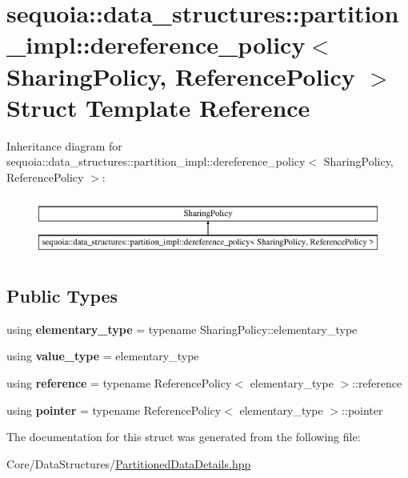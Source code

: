 \hypertarget{structsequoia_1_1data__structures_1_1partition__impl_1_1dereference__policy}{}\section{sequoia\+::data\+\_\+structures\+::partition\+\_\+impl\+::dereference\+\_\+policy$<$ Sharing\+Policy, Reference\+Policy $>$ Struct Template Reference}
\label{structsequoia_1_1data__structures_1_1partition__impl_1_1dereference__policy}
Inheritance diagram for sequoia\+::data\+\_\+structures\+::partition\+\_\+impl\+::dereference\+\_\+policy$<$ Sharing\+Policy, Reference\+Policy $>$\+:\begin{figure}[H]
\begin{center}
\leavevmode
\includegraphics[height=2.000000cm]{structsequoia_1_1data__structures_1_1partition__impl_1_1dereference__policy}
\end{center}
\end{figure}
\subsection*{Public Types}
\begin{DoxyCompactItemize}
\item 
\mbox{\label{structsequoia_1_1data__structures_1_1partition__impl_1_1dereference__policy_a78e942760cb717bfc3a812b8de2b7810}} 
using {\bfseries elementary\+\_\+type} = typename Sharing\+Policy\+::elementary\+\_\+type
\item 
\mbox{\label{structsequoia_1_1data__structures_1_1partition__impl_1_1dereference__policy_a9dea1ba6996bd3ed1021e483abe0fa48}} 
using {\bfseries value\+\_\+type} = elementary\+\_\+type
\item 
\mbox{\label{structsequoia_1_1data__structures_1_1partition__impl_1_1dereference__policy_afed10ebec2c1172836f4f5a988ed6a52}} 
using {\bfseries reference} = typename Reference\+Policy$<$ elementary\+\_\+type $>$\+::reference
\item 
\mbox{\label{structsequoia_1_1data__structures_1_1partition__impl_1_1dereference__policy_a803285e673cdf7c68a89b74e8ae7c164}} 
using {\bfseries pointer} = typename Reference\+Policy$<$ elementary\+\_\+type $>$\+::pointer
\end{DoxyCompactItemize}


The documentation for this struct was generated from the following file\+:\begin{DoxyCompactItemize}
\item 
Core/\+Data\+Structures/\mbox{\hyperlink{_partitioned_data_details_8hpp}{Partitioned\+Data\+Details.\+hpp}}\end{DoxyCompactItemize}
